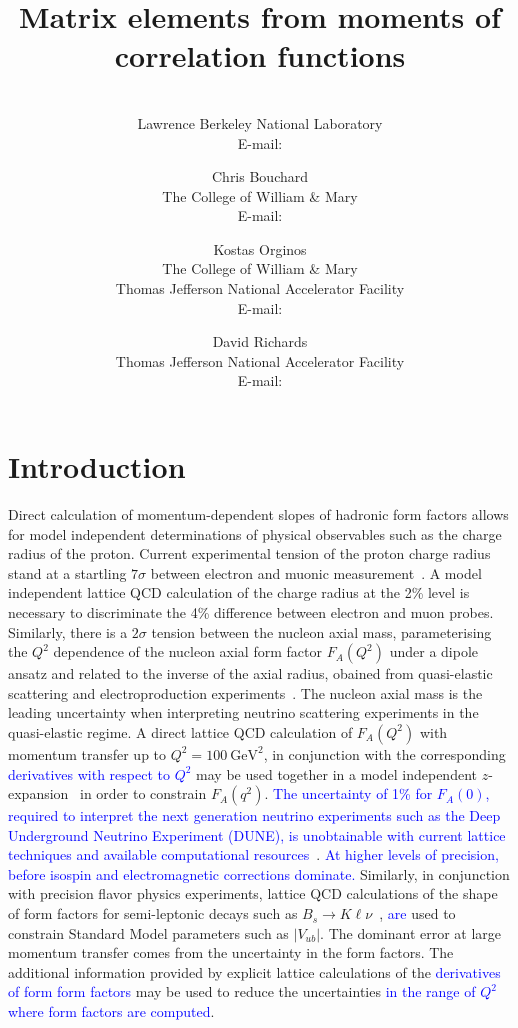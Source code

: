 \documentclass{PoS}
\title{Matrix elements from moments of correlation functions}
\author{\speaker{Chia Cheng Chang}\\
        Lawrence Berkeley National Laboratory\\
        E-mail: \email{chiachang@lbl.gov}}
\author{Chris Bouchard\\
                The College of William \& Mary\\
                E-mail: \email{cmbouchard@wm.edu}}
\author{Kostas Orginos\\
                The College of William \& Mary \\
Thomas Jefferson National Accelerator Facility\\
E-mail: \email{kostas@wm.edu}}
\author{David Richards\\
Thomas Jefferson National Accelerator Facility\\
E-mail: \email{djr@jlab.org}}
\newcommand{\kno}[1]{\textcolor{blue}{#1}}
\begin{document}
\section{Introduction}
Direct calculation of momentum-dependent slopes of hadronic form factors allows for model independent determinations of physical observables such as the charge radius of the proton.  Current experimental tension of the proton charge radius stand at a startling $7\sigma$ between electron and muonic measurement~\cite{Carlson:2015jba}. A model independent lattice QCD calculation of the charge radius at the 2\% level is necessary to discriminate the 4\% difference between electron and muon probes. Similarly, there is a $2\sigma$ tension between the nucleon axial mass, parameterising the $Q^2$ dependence of the nucleon axial form factor $F_A(Q^2)$ under a dipole ansatz and related to the inverse of the axial radius, obained from quasi-elastic scattering and electroproduction experiments~\cite{Anikin:2016teg}. The nucleon axial mass is the leading uncertainty when interpreting neutrino scattering experiments in the quasi-elastic regime. A direct lattice QCD calculation of $F_A(Q^2)$ with momentum transfer up to $Q^2=100~\text{GeV}^2$, in conjunction with the corresponding  \kno{derivatives with respect to $Q^2$}  may be used together in a model independent $z$-expansion~\cite{Bhattacharya:2011ah} in order to constrain $F_A(q^2)$.  \kno{The uncertainty of 1\% for $F_A(0)$, required to interpret the next generation neutrino experiments such as the Deep Underground Neutrino Experiment (DUNE), is unobtainable with current lattice techniques and  available computational resources}~\cite{Bhattacharya:2016zcn}. \kno{At higher levels of precision, before isospin and electromagnetic corrections dominate. } Similarly, in conjunction with precision flavor physics experiments, lattice QCD calculations of the shape of form factors for semi-leptonic decays such as $B_s\rightarrow K \ell \nu$~\cite{Bouchard:2014ypa}, \kno{are} used to constrain Standard Model parameters such as $|V_{ub}|$. The dominant error at large momentum transfer comes from the uncertainty in the form factors. The additional information provided by explicit lattice calculations of the \kno{derivatives of form form factors} may be used to reduce the uncertainties  \kno{in the range of  $Q^2$ where form factors are computed}.
\end{document}
